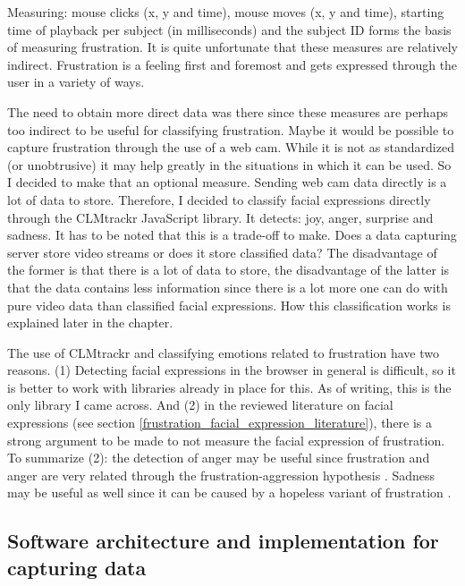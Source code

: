 Measuring: mouse clicks (x, y and time), mouse moves (x, y and time), starting time of playback per subject (in milliseconds) and the subject ID forms the basis of measuring frustration. It is quite unfortunate that these measures are relatively indirect. Frustration is a feeling first and foremost and gets expressed through the user in a variety of ways. 

The need to obtain more direct data was there since these measures are perhaps too indirect to be useful for classifying frustration. Maybe it would be possible to capture frustration through the use of a web cam. While it is not as standardized (or unobtrusive) it may help greatly in the situations in which it can be used. So I decided to make that an optional measure. Sending web cam data directly is a lot of data to store. Therefore, I decided to classify facial expressions directly through the CLMtrackr JavaScript library. It detects: joy, anger, surprise and sadness. It has to be noted that this is a trade-off to make. Does a data capturing server store video streams or does it store classified data? The disadvantage of the former is that there is a lot of data to store, the disadvantage of the latter is that the data contains less information since there is a lot more one can do with pure video data than classified facial expressions. How this classification works is explained later in the chapter. 

The use of CLMtrackr and classifying emotions related to frustration have two reasons. (1) Detecting facial expressions in the browser in general is difficult, so it is better to work with libraries already in place for this. As of writing, this is the only library I came across. And (2) in the reviewed literature on facial expressions (see section \ref{frustration_facial_expression_literature}), there is a strong argument to be made to not measure the facial expression of frustration. To summarize (2): the detection of anger may be useful since frustration and anger are very related through the frustration-aggression hypothesis \cite{roest2015}. Sadness may be useful as well since it can be caused by a hopeless variant of frustration \cite{kuppens2003}.

\subsection{Software architecture and implementation for capturing data}


